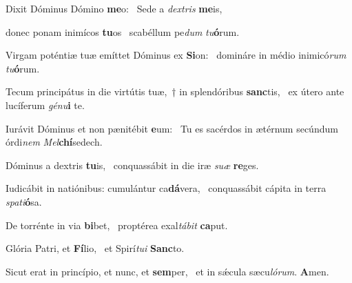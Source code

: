 \item Dixit Dóminus Dómino \textbf{me}o:~\psstar{} Sede a \textit{dextris} \textbf{me}is,

\item donec ponam inimícos \textbf{tu}os~\psstar{} scabéllum pe\textit{dum} \textit{tu}\textbf{ó}rum.

\item Virgam poténtiæ tuæ emíttet Dóminus ex \textbf{Si}on:~\psstar{} domináre in médio inimicó\textit{rum} \textit{tu}\textbf{ó}rum.

\item Tecum principátus in die virtútis tuæ,~† in splendóribus \textbf{sanc}tis,~\psstar{} ex útero ante lucíferum \textit{génu}\textbf{i} te.

\item Iurávit Dóminus et non pænitébit \textbf{e}um:~\psstar{} Tu es sacérdos in ætérnum secúndum órdi\textit{nem} \textit{Mel}\textbf{chí}sedech.

\item Dóminus a dextris \textbf{tu}is,~\psstar{} conquassábit in die iræ \textit{suæ} \textbf{re}ges.

\item Iudicábit in natiónibus: cumulántur ca\textbf{dá}vera,~\psstar{} conquassábit cápita in terra \textit{spati}\textbf{ó}sa.

\item De torrénte in via \textbf{bi}bet,~\psstar{} proptérea exal\textit{tábit} \textbf{ca}put.

\item Glória Patri, et \textbf{Fí}lio,~\psstar{} et Spirí\textit{tui} \textbf{Sanc}to.

\item Sicut erat in princípio, et nunc, et \textbf{sem}per,~\psstar{} et in sǽcula sæcu\textit{lórum}. \textbf{A}men.